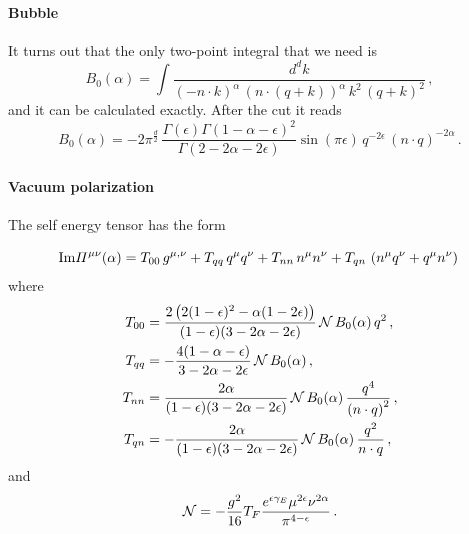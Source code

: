\documentclass[a4paper,11pt]{report}
\numberwithin{equation}{section}
\begin{document}
\paragraph{Bubble}

It turns out that the only two-point integral that we need is
%
\begin{equation}
  B_0(\alpha) = 
  \int\frac{d^d k}{(-n\cdot k)^{\alpha}\, (n\cdot (q+k))^{\alpha}\, k^2\,
  (q+k)^2}\,,
\end{equation}
%
and it can be calculated exactly. After the cut it reads
%
\begin{equation}
  B_0(\alpha) = 
 -2 \pi ^{\frac{d}{2}}\,
  \frac{\Gamma (\epsilon ) \Gamma (1-\alpha -\epsilon )^2 }
  {\Gamma (2-2\alpha -2\epsilon)}\sin (\pi  \epsilon )\,
  q^{-2 \epsilon }\, (n \cdot q)^{-2 \alpha }\,.
\end{equation}

\paragraph{Vacuum polarization}
%
The self energy tensor has the form
%

\begin{equation}
  \text{Im} \Pi^{\mu\nu}(\alpha) = 
  T_{00}\, g^{\mu,\nu} +
  T_{qq}\, q^{\mu}q^{\nu} +
  T_{nn}\, n^{\mu}n^{\nu} +
  T_{qn}\, \left(n^{\mu} q^{\nu}+q^{\mu} n^{\nu}\right)\,
\end{equation}
%
where
%
\begin{subequations}
  \begin{align}
  T_{00} &= \frac{2 \left(2 (1-\epsilon)^2-\alpha  (1-2 \epsilon)\right)}
  {(1-\epsilon) (3-2 \alpha -2 \epsilon)}
  \, {\cal N}\, B_0(\alpha)\,
  q^2 
  \,,\\
  T_{qq} &= -\frac{4 (1-\alpha -\epsilon)}{3-2 \alpha -2 \epsilon} 
  \,{\cal N}\, B_0(\alpha)\,,\\
  T_{nn} &= 
  \frac{2 \alpha }{(1-\epsilon) (3-2 \alpha -2 \epsilon)}
  \,{\cal N}\, B_0(\alpha)\,
  \frac{q^4}{\left(n\cdot q\right)^2}
  \,,\\
  T_{qn} &= 
  -\frac{2 \alpha}{(1-\epsilon) (3-2 \alpha -2 \epsilon) }
  \,{\cal N}\, B_0(\alpha)\,
  \frac{q^2}{n\cdot q}
  \,,
  \end{align}
\end{subequations}
%
and
%
\begin{equation}
  {\cal N} = -\frac{g^2}{16} T_F 
  \frac{e^{\epsilon\gamma_E}\mu^{2\epsilon}\nu^{2\alpha}}{\pi^{4-\epsilon}}\,.
\end{equation}
\end{document}
